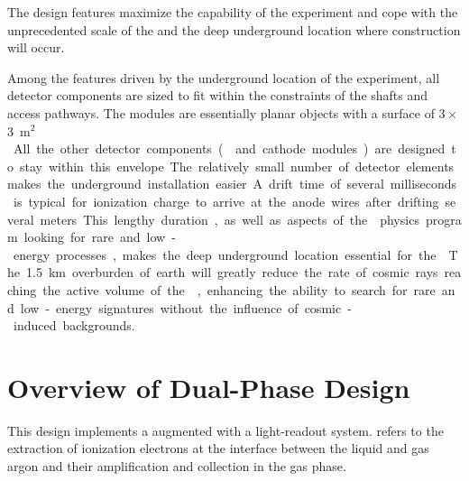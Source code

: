 The  design features maximize the capability of the experiment and cope with the unprecedented scale of the  and the deep underground location where construction will occur.

Among the features driven by the underground location of the experiment, all detector components are sized to fit within the constraints of the  shafts and access pathways. The  modules are essentially planar objects with a surface of \num{3}\,$\times$\,\SI{3}{m$^2$}. All the other detector 
components ( and cathode modules) are  designed to stay within this envelope. The relatively small number of detector elements makes the underground installation easier.

A drift time of several milliseconds is typical for ionization charge to arrive at the anode wires after drifting several meters.  This lengthy duration, as well as aspects of the  physics program looking for rare and low-energy processes, makes the deep underground location essential for the .  The \SI{1.5}{km} overburden of earth will greatly reduce the rate of cosmic rays reaching the active volume of the , enhancing the ability to search for rare and low-energy signatures without the influence of cosmic-induced backgrounds.  


\section{Overview of Dual-Phase Design}
\label{sec:dp-execsum-description}

This  design implements a   augmented with a light-readout system.   refers to the extraction of ionization electrons at the interface between the liquid and gas argon and their amplification and collection in the gas phase.

